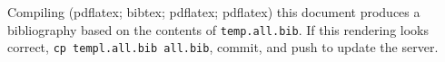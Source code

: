 \documentclass{article}
\begin{document}
\nocite{*}

Compiling (pdflatex; bibtex; pdflatex; pdflatex) this document produces a bibliography based on the contents of \texttt{temp.all.bib}. If this rendering looks correct, \texttt{cp templ.all.bib all.bib}, commit, and push to update the server.

\printbibliography
\end{document}
